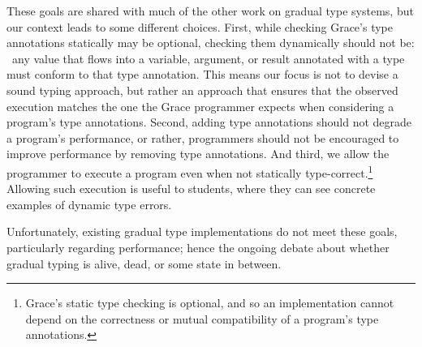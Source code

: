 These goals are shared with
much of the other work on gradual type systems,
but our context leads to some different choices.
First,
while checking Grace's type annotations statically may be optional,
checking them dynamically should not be:%
~any value that flows into a variable, argument, or result
annotated with a type must conform to that type annotation.
This means our focus is not to devise a sound typing approach,
but rather an approach that ensures that the observed execution matches
the one the Grace programmer expects when considering a program's type annotations.
Second, 
adding type annotations should not degrade a program's performance,
or rather, programmers should not be encouraged to
improve performance by removing type annotations.
And third, 
we allow the programmer to execute a program even when not statically type-correct.\footnote{Grace's static type checking is optional, and so an
implementation cannot depend on the correctness or mutual
compatibility of a program's type
annotations.}
Allowing such execution is useful to students,
where they can see concrete examples of dynamic type errors.

Unfortunately, existing gradual type
implementations do not meet these goals, particularly regarding
performance; hence the ongoing debate about whether gradual typing is
alive, dead, or some state
in between\citep{Takikawa2016,Vitousek2017,Muehlboeck2017,Bauman2017,Richards2017,Greenman2018}.




